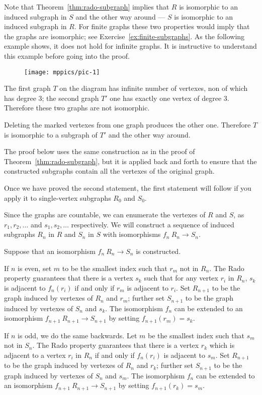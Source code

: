 Note that Theorem~\ref{thm:rado-subgraph} implies that $R$ is isomorphic to an induced subgraph in $S$ and the other way around --- $S$ is isomorphic to an induced subgraph in $R$.
For finite graphs these two properties would imply that the graphs are isomorphic; see Exercise~\ref{ex:finite-subgraphs}.
As the following example shows, it does not hold for infinite graphs.
It is instructive to understand this example before going into the proof.

\begin{figure}[h!]%
\vskip-0mm
\centering
\texttt{[image: mppics/pic-1]}
\vskip-0mm
\end{figure}
 
The first graph $T$ on the diagram has infinite number of vertexes, non of which has degree 3;
the second graph $T'$ one has exactly one vertex of degree 3. 
Therefore these two graphs are not isomorphic.

Deleting the marked vertexes from one graph produces the other one. 
Therefore $T$ is isomorphic to a subgraph of $T'$ and the other way around.

The proof below uses the same construction as in the proof of Theorem~\ref{thm:rado-subgraph}, but it is applied back and forth to ensure that the constructed subgraphs contain all the vertexes of the original graph.


Once we have proved the second statement,
the first statement will follow if you apply it to single-vertex subgraphs $R_0$ and $S_0$.

Since the graphs are countable,
we can enumerate the vertexes of $R$ and $S$, as $r_1 , r_2 , \dots$ and $s_1, s_2,\dots$ respectively. 
We will construct a sequence of induced subgraphs $R_n$ in $R$ and $S_n$ in $S$ with isomorphisms $f_n\:R_n\to S_n$.

Suppose that an isomorphism $f_n\:R_n\to S_n$ is constructed. 

If $n$ is even, set $m$ to be the smallest index such that $r_m$ not in $R_n$.
The Rado property guarantees that there is a vertex $s_k$ such that for any vertex $r_i$ in $R_n$, $s_k$ is adjacent to $f_n(r_i)$ if and only if $r_m$ is adjacent to $r_i$.
Set $R_{n+1}$ to be the graph induced by vertexes of $R_n$ and $r_m$;
further set $S_{n+1}$ to be the graph induced by vertexes of $S_n$ and $s_k$.
The isomorphism $f_n$ can be extended to an isomorphism $f_{n+1}\:R_{n+1}\to S_{n+1}$ by
setting $f_{n+1}(r_m)=s_k$.  

If $n$ is odd, we do the same backwards.
Let $m$ be the smallest index such that $s_m$ not in $S_n$.
The Rado property guarantees that there is a vertex $r_k$ which is adjacent to a vertex $r_i$ in $R_n$ if and only if $f_n(r_i)$ is adjacent to $s_m$.
Set $R_{n+1}$ to be the graph induced by vertexes of $R_n$ and $r_k$;
further set $S_{n+1}$ to be the graph induced by vertexes of $S_n$ and $s_m$.
The isomorphism $f_n$ can be extended to an isomorphism $f_{n+1}\:R_{n+1}\to S_{n+1}$ by
setting $f_{n+1}(r_k)=s_m$.

